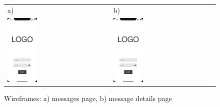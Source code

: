 \begin{figure}[htb]
    \centering
    \begin{tabular}{@{}ll@{}}
        a) & b) \\
        \includegraphics[page=4,width=0.300\textwidth]{fig03/jsos_helper_wireframe.pdf} &
        \includegraphics[page=5,width=0.300\textwidth]{fig03/jsos_helper_wireframe.pdf} \\
            \end{tabular}
    \caption{Wireframes: a) messages page, b) message details page} \label{fig:messages-and-details}
\end{figure}
